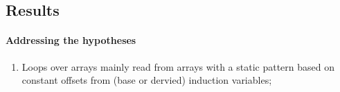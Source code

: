 \subsection{Results}

\paragraph{Addressing the hypotheses}

\begin{enumerate}
\item Loops over arrays mainly read from arrays with a static pattern
based on constant offsets from (base or dervied) induction variables;
\end{enumerate}

